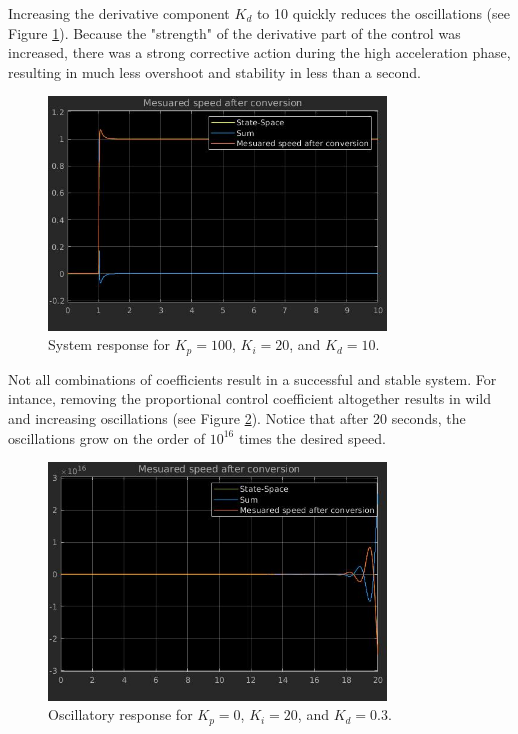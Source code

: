 \documentclass{journal}
\begin{document}
\begin{enumerate}[label=(\alph*)]
	Increasing the derivative component $K_d$ to 10 quickly reduces the oscillations (see Figure \ref{fig:PID_100_20_10}).  Because the "strength" of the derivative part of the control was increased, there was a strong corrective action during the high acceleration phase, resulting in much less overshoot and stability in less than a second.

	\begin{figure}[H]
		\centering
		\includegraphics[width = 0.8\textwidth]{Lab1PID_100_20_10.jpg}
		\caption{System response for $K_p = 100$, $K_i = 20$, and $K_d = 10$.}
		\label{fig:PID_100_20_10}
	\end{figure}

	Not all combinations of coefficients result in a successful and stable system.  For intance, removing the proportional control coefficient altogether results in wild and increasing oscillations (see Figure \ref{fig:PID_0_20_03}).  Notice that after 20 seconds, the oscillations grow on the order of $10^{16}$ times the desired speed.

	\begin{figure}[H]
		\centering
		\includegraphics[width = 0.8\textwidth]{Lab1PID_0_20_0point3.jpg}
		\caption{Oscillatory response for $K_p = 0$, $K_i = 20$, and $K_d = 0.3$.}
		\label{fig:PID_0_20_03}
	\end{figure}


\end{enumerate}
\end{document}

